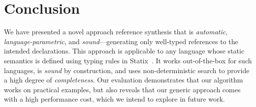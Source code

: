 \pagebreak[4]  %
\section{Conclusion}%
\label{sec:conclusion}

We have presented a novel approach reference synthesis that is \emph{automatic}, \emph{language-parametric}, and \emph{sound}---generating only well-typed references to the intended declarations.
This approach is applicable to any language whose static semantics is defined using typing rules in Statix~\cite{AntwerpenPRV18}.
It works out-of-the-box for such languages, is \emph{sound} by construction, and uses non-deterministic search to provide a high degree of \emph{completeness}.
Our evaluation demonstrates that our algorithm works on practical examples, but also reveals that our generic approach comes with a high performance cost, which we intend to explore in future work.

